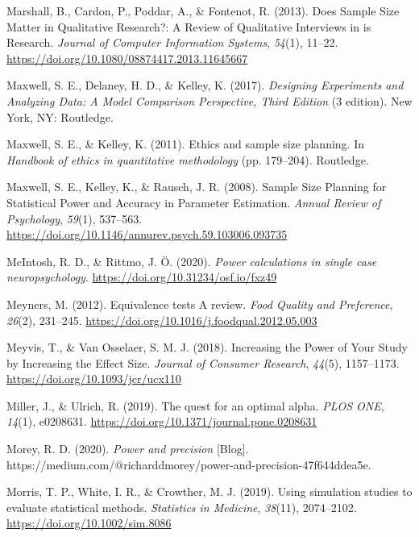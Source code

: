 \documentclass[
  english,
  ,jou, a4paper,floatsintext]{apa6}
\newlength{\cslhangindent}
\newenvironment{cslreferences}%
  {\setlength{\parindent}{0pt}%
  \everypar{\setlength{\hangindent}{\cslhangindent}}\ignorespaces}%
  {\par}
\begin{document}
\begin{cslreferences}
\leavevmode\hypertarget{ref-marshall_does_2013}{}%
Marshall, B., Cardon, P., Poddar, A., \& Fontenot, R. (2013). Does Sample Size Matter in Qualitative Research?: A Review of Qualitative Interviews in is Research. \emph{Journal of Computer Information Systems}, \emph{54}(1), 11--22. \url{https://doi.org/10.1080/08874417.2013.11645667}

\leavevmode\hypertarget{ref-maxwell_designing_2017}{}%
Maxwell, S. E., Delaney, H. D., \& Kelley, K. (2017). \emph{Designing Experiments and Analyzing Data: A Model Comparison Perspective, Third Edition} (3 edition). New York, NY: Routledge.

\leavevmode\hypertarget{ref-maxwell_ethics_2011}{}%
Maxwell, S. E., \& Kelley, K. (2011). Ethics and sample size planning. In \emph{Handbook of ethics in quantitative methodology} (pp. 179--204). Routledge.

\leavevmode\hypertarget{ref-maxwell_sample_2008}{}%
Maxwell, S. E., Kelley, K., \& Rausch, J. R. (2008). Sample Size Planning for Statistical Power and Accuracy in Parameter Estimation. \emph{Annual Review of Psychology}, \emph{59}(1), 537--563. \url{https://doi.org/10.1146/annurev.psych.59.103006.093735}

\leavevmode\hypertarget{ref-mcintosh_power_2020}{}%
McIntosh, R. D., \& Rittmo, J. Ö. (2020). \emph{Power calculations in single case neuropsychology}. \url{https://doi.org/10.31234/osf.io/fxz49}

\leavevmode\hypertarget{ref-meyners_equivalence_2012}{}%
Meyners, M. (2012). Equivalence tests A review. \emph{Food Quality and Preference}, \emph{26}(2), 231--245. \url{https://doi.org/10.1016/j.foodqual.2012.05.003}

\leavevmode\hypertarget{ref-meyvis_increasing_2018}{}%
Meyvis, T., \& Van Osselaer, S. M. J. (2018). Increasing the Power of Your Study by Increasing the Effect Size. \emph{Journal of Consumer Research}, \emph{44}(5), 1157--1173. \url{https://doi.org/10.1093/jcr/ucx110}

\leavevmode\hypertarget{ref-miller_quest_2019}{}%
Miller, J., \& Ulrich, R. (2019). The quest for an optimal alpha. \emph{PLOS ONE}, \emph{14}(1), e0208631. \url{https://doi.org/10.1371/journal.pone.0208631}

\leavevmode\hypertarget{ref-morey_power_2020}{}%
Morey, R. D. (2020). \emph{Power and precision} {[}Blog{]}. https://medium.com/@richarddmorey/power-and-precision-47f644ddea5e.

\leavevmode\hypertarget{ref-morris_using_2019}{}%
Morris, T. P., White, I. R., \& Crowther, M. J. (2019). Using simulation studies to evaluate statistical methods. \emph{Statistics in Medicine}, \emph{38}(11), 2074--2102. \url{https://doi.org/10.1002/sim.8086}


\end{cslreferences}
\end{document}
